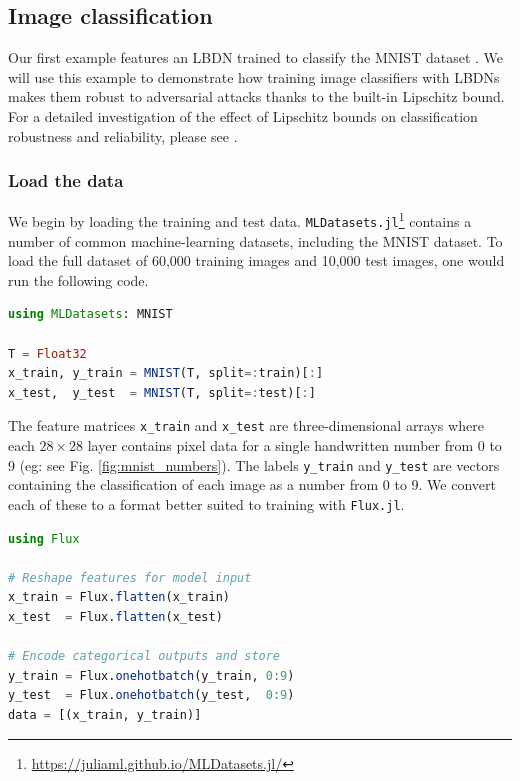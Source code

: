 \subsection{Image classification} \label{sec:mnist}

Our first example features an LBDN trained to classify the MNIST dataset \cite{LeCun++2010}. We will use this example to demonstrate how training image classifiers with LBDNs makes them robust to adversarial attacks thanks to the built-in Lipschitz bound. For a detailed investigation of the effect of Lipschitz bounds on classification robustness and reliability, please see \cite{Wang+Manchester2023}.

\subsubsection{Load the data} \label{sec:mnist-data}

We begin by loading the training and test data. \verb|MLDatasets.jl|\footnote{\url{https://juliaml.github.io/MLDatasets.jl/}} contains a number of common machine-learning datasets, including the MNIST dataset. To load the full dataset of 60,000 training images and 10,000 test images, one would run the following code.

\begin{lstlisting}[language = Julia]
using MLDatasets: MNIST

T = Float32
x_train, y_train = MNIST(T, split=:train)[:]
x_test,  y_test  = MNIST(T, split=:test)[:]
\end{lstlisting}

The feature matrices \verb|x_train| and \verb|x_test| are three-dimensional arrays where each $28 \times 28$ layer contains pixel data for a single handwritten number from 0 to 9 (eg: see Fig. \ref{fig:mnist_numbers}). The labels \verb|y_train| and \verb|y_test| are vectors containing the classification of each image as a number from 0 to 9. We convert each of these to a format better suited to training with \verb|Flux.jl|.

\begin{lstlisting}[language = Julia]
using Flux

# Reshape features for model input
x_train = Flux.flatten(x_train)
x_test  = Flux.flatten(x_test)

# Encode categorical outputs and store
y_train = Flux.onehotbatch(y_train, 0:9)
y_test  = Flux.onehotbatch(y_test,  0:9)
data = [(x_train, y_train)]
\end{lstlisting}

